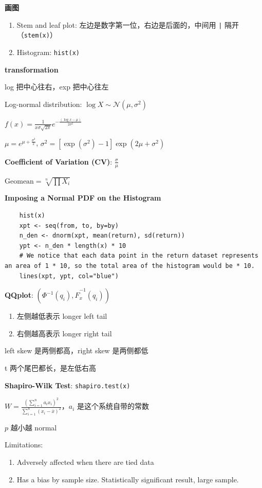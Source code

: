 \documentclass[9pt,landscape]{article}
\begin{document}
\begin{multicols}{3}
\textbf{画图}
\begin{enumerate}
	\item Stem and leaf plot: 左边是数字第一位，右边是后面的，中间用 \texttt{|} 隔开（\texttt{stem(x)}）
	\item Histogram: \texttt{hist(x)}
\end{enumerate}

\textbf{transformation}

log 把中心往右，exp 把中心往左

Log-normal distribution: $\log X\sim\mathcal{N}(\mu,\sigma^2)$

$f(x)=\frac{1}{x\sigma\sqrt{2\pi}}e^{-\frac{(\log x-\mu)}{2\sigma^2}}$

$\mu=e^{\mu+\frac{\sigma^2}{2}}$, $\sigma^2=[\exp(\sigma^2)-1]\exp(2\mu+\sigma^2)$

\textbf{Coefficient of Variation (CV)}: $\frac{\sigma}{\mu}$

$\mathrm{Geomean}=\sqrt[n]{\prod X_i}$

\textbf{Imposing a Normal PDF on the Histogram}

\begin{lstlisting}
	hist(x)
	xpt <- seq(from, to, by=by)
	n_den <- dnorm(xpt, mean(return), sd(return))
	ypt <- n_den * length(x) * 10
	# We notice that each data point in the return dataset represents an area of 1 * 10, so the total area of the histogram would be * 10. 
	lines(xpt, ypt, col="blue")
\end{lstlisting}

\textbf{QQplot}: $\left(\Phi^{-1}(q_i), \hat{F}^{-1}_x(q_i)\right)$
\begin{enumerate}
	\item 左侧越低表示 longer left tail
	\item 右侧越高表示 longer right tail
\end{enumerate}

left skew 是两侧都高，right skew 是两侧都低

t 两个尾巴都长，是左低右高

\textbf{Shapiro-Wilk Test}: \texttt{shapiro.test(x)}

$W=\frac{\left(\sum_{i=1}^{n}a_ix_i\right)^2}{\sum_{i=1}^{n}(x_i-\overline{x})^2}$，$a_i$ 是这个系统自带的常数

$p$ 越小越 normal

Limitations:
\begin{enumerate}
	\item Adversely affected when there are tied data
	\item Has a bias by sample size. Statistically significant result, large sample.
\end{enumerate}


\end{multicols}
\end{document}
